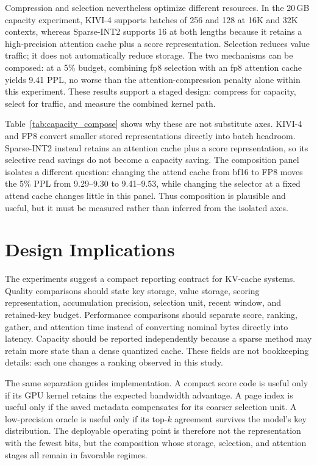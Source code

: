 \documentclass[sigplan,anonymous,review,nonacm]{acmart}
\begin{document}
Compression and selection nevertheless optimize different resources. In the 20\,GB
capacity experiment, KIVI-4 supports batches of 256 and 128 at 16K and 32K contexts,
whereas Sparse-INT2 supports 16 at both lengths because it retains a high-precision
attention cache plus a score representation. Selection reduces value traffic; it does
not automatically reduce storage. The two mechanisms can be composed: at a 5\%
budget, combining fp8 selection with an fp8 attention cache yields 9.41 PPL, no worse
than the attention-compression penalty alone within this experiment. These results
support a staged design: compress for capacity, select for traffic, and measure the
combined kernel path.

Table~\ref{tab:capacity_compose} shows why these are not substitute axes. KIVI-4 and
FP8 convert smaller stored representations directly into batch headroom. Sparse-INT2
instead retains an attention cache plus a score representation, so its selective read
savings do not become a capacity saving. The composition panel isolates a different
question: changing the attend cache from bf16 to FP8 moves the 5\% PPL from 9.29--9.30
to 9.41--9.53, while changing the selector at a fixed attend cache changes little in
this panel. Thus composition is plausible and useful, but it must be measured rather
than inferred from the isolated axes.


\section{Design Implications}
The experiments suggest a compact reporting contract for KV-cache systems. Quality
comparisons should state key storage, value storage, scoring representation,
accumulation precision, selection unit, recent window, and retained-key budget.
Performance comparisons should separate score, ranking, gather, and attention time
instead of converting nominal bytes directly into latency. Capacity should be
reported independently because a sparse method may retain more state than a dense
quantized cache. These fields are not bookkeeping details: each one changes a ranking
observed in this study.

The same separation guides implementation. A compact score code is useful only if
its GPU kernel retains the expected bandwidth advantage. A page index is useful only
if the saved metadata compensates for its coarser selection unit. A low-precision
oracle is useful only if its top-$k$ agreement survives the model's key distribution.
The deployable operating point is therefore not the representation with the fewest
bits, but the composition whose storage, selection, and attention stages all remain
in favorable regimes.
\end{document}
